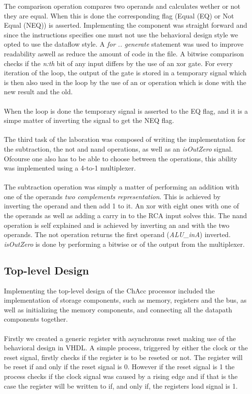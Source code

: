 \documentclass[a4paper,11pt]{article}
\begin{document}
\noindent
The comparison operation compares two operands and calculates wether or not 
they are equal. When this is done the corresponding flag (Equal (EQ) or Not 
Equal (NEQ)) is asserted. Implementing the component was straight forward and 
since the instructions specifies one must not use the behavioral design style 
we opted to use the dataflow style. A {\it for .. generate} statement was used 
to improve readability aswell as reduce the amount of code in the file. A 
bitwise comparison checks if the {\it n:th} bit of any input differs by the 
use of an xor gate. For every iteration of the loop, the output of the gate is 
stored in a temporary signal which is then also used in the loop by the use 
of an or operation which is done with the new result and the old.\\\\
\noindent
When the loop is done the temporary signal is asserted to the EQ flag, and it 
is a simpe matter of inverting the signal to get the NEQ flag.\\\\
\noindent
The third task of the laboration was composed of writing the implementation 
for the subtraction, the not and nand operations, as well as an {\it isOutZero} 
signal. Ofcourse one also has to be able to choose between the 
operations, this ability  was implemented using a 4-to-1 multiplexer.\\\\
\noindent
The subtraction operation was simply a matter of performing an addition with 
one of the operands {\it two complements representation}. This is achieved by 
inverting the operand and then add 1 to it. An xor with eight ones with one of 
the operands as well as adding a carry in to the RCA input solves this. The 
nand operation is self explained and is achieved by inverting an and with the 
two operands. The not operation returns the first operand ({\it ALU\_inA}) 
inverted. {\it isOutZero} is done by performing a bitwise or of the output 
from the multiplexer.

\subsection{Top-level Design}
Implementing the top-level design of the ChAcc processor included the 
implementation of storage components, such as memory, registers and the 
bus, as well as initializing the memory components, and connecting all the 
datapath components together.\\\\
\noindent
Firstly we created a generic register with asynchronus reset making use 
of the behavioral design in VHDL. A simple process, triggered by either 
the clock or the reset signal, firstly checks if the register is to be reseted 
or not. The register will be reset if and only if the reset signal is 0. 
However if the reset signal is 1 the process checks if the clock signal was 
caused by a rising edge and if that is the case the register will be written 
to if, and only if, the registers load signal is 1.\\
\end{document}
